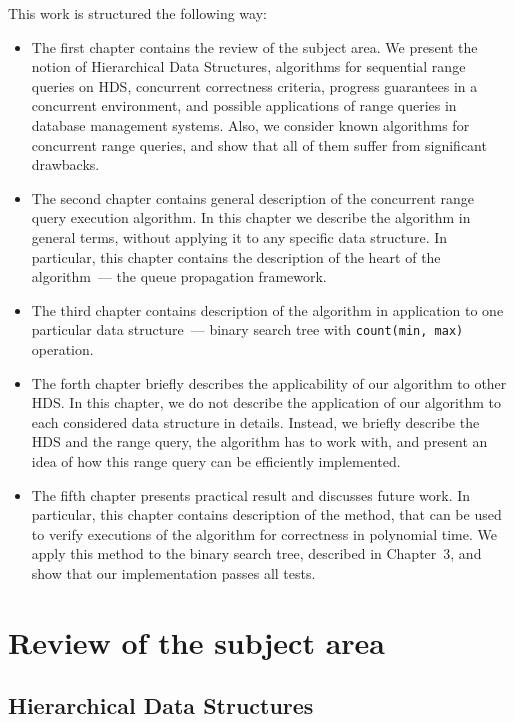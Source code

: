 \documentclass[times, dvipsnames,%
               languages={russian,english} %
              ]{itmo-student-thesis}
\begin{document}
This work is structured the following way:
\begin{itemize}
    \item The first chapter contains the review of the subject area. We present the notion of Hierarchical Data Structures, algorithms for sequential range queries on HDS, concurrent correctness criteria, progress guarantees in a concurrent environment, and possible applications of range queries in database management systems. Also, we consider known algorithms for concurrent range queries, and show that all of them suffer from significant drawbacks.
    
    \item The second chapter contains general description of the concurrent range query execution algorithm. In this chapter we describe the algorithm in general terms, without applying it to any specific data structure. In particular, this chapter contains the description of the heart of the algorithm~--- the queue propagation framework.
    
    \item The third chapter contains description of the algorithm in application to one particular data structure~--- binary search tree with \texttt{count(min, max)} operation. 
    
    \item The forth chapter briefly describes the applicability of our algorithm to other HDS. In this chapter, we do not describe the application of our algorithm to each considered data structure in details. Instead, we briefly describe the HDS and the range query, the algorithm has to work with, and present an idea of how this range query can be efficiently implemented.
    
    \item The fifth chapter presents practical result and discusses future work. In particular, this chapter contains description of the method, that can be used to verify executions of the algorithm for correctness in polynomial time. We apply this method to the binary search tree, described in Chapter~3, and show that our implementation passes all tests.
\end{itemize}

\chapter{Review of the subject area}

\section{Hierarchical Data Structures}
\end{document}
